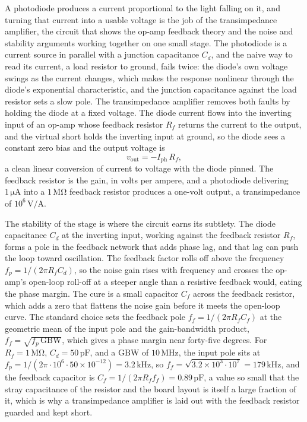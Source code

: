 A photodiode produces a current proportional to the light falling on it, and
turning that current into a usable voltage is the job of the transimpedance
amplifier, the circuit that shows the op-amp feedback theory and the noise and
stability arguments working together on one small stage. The photodiode is a
current source in parallel with a junction capacitance $C_d$, and the naive way
to read its current, a load resistor to ground, fails twice: the diode's own
voltage swings as the current changes, which makes the response nonlinear
through the diode's exponential characteristic, and the junction capacitance
against the load resistor sets a slow pole. The transimpedance amplifier removes
both faults by holding the diode at a fixed voltage. The diode current flows
into the inverting input of an op-amp whose feedback resistor $R_f$ returns the
current to the output, and the virtual short holds the inverting input at
ground, so the diode sees a constant zero bias and the output voltage is
\[
v_{\text{out}} = -I_{\text{ph}}\,R_f,
\]
a clean linear conversion of current to voltage with the diode pinned. The
feedback resistor is the gain, in volts per ampere, and a photodiode delivering
$1\,\si{\micro\ampere}$ into a $1\,\si{\mega\ohm}$ feedback resistor produces a
one-volt output, a transimpedance of $10^{6}\,\si{\volt\per\ampere}$.

The stability of the stage is where the circuit earns its subtlety. The diode
capacitance $C_d$ at the inverting input, working against the feedback resistor
$R_f$, forms a pole in the feedback network that adds phase lag, and that lag can
push the loop toward oscillation. The feedback factor rolls off above the
frequency $f_p = 1/(2\pi R_f C_d)$, so the noise gain rises with frequency and
crosses the op-amp's open-loop roll-off at a steeper angle than a resistive
feedback would, eating the phase margin. The cure is a small capacitor $C_f$
across the feedback resistor, which adds a zero that flattens the noise gain
before it meets the open-loop curve. The standard choice sets the feedback pole
$f_f = 1/(2\pi R_f C_f)$ at the geometric mean of the input pole and the
gain-bandwidth product, $f_f = \sqrt{f_p\,\text{GBW}}$, which gives a phase
margin near forty-five degrees. For $R_f = 1\,\si{\mega\ohm}$, $C_d = 50\,\si{
\pico\farad}$, and a $\text{GBW}$ of $10\,\si{\mega\hertz}$, the input pole sits
at $f_p = 1/(2\pi\cdot 10^{6}\cdot 50\times 10^{-12}) = 3.2\,\si{\kilo\hertz}$,
so $f_f = \sqrt{3.2\times 10^{3}\cdot 10^{7}} = 179\,\si{\kilo\hertz}$, and the
feedback capacitor is $C_f = 1/(2\pi R_f f_f) = 0.89\,\si{\pico\farad}$, a value
so small that the stray capacitance of the resistor and the board layout is
itself a large fraction of it, which is why a transimpedance amplifier is laid
out with the feedback resistor guarded and kept short.

